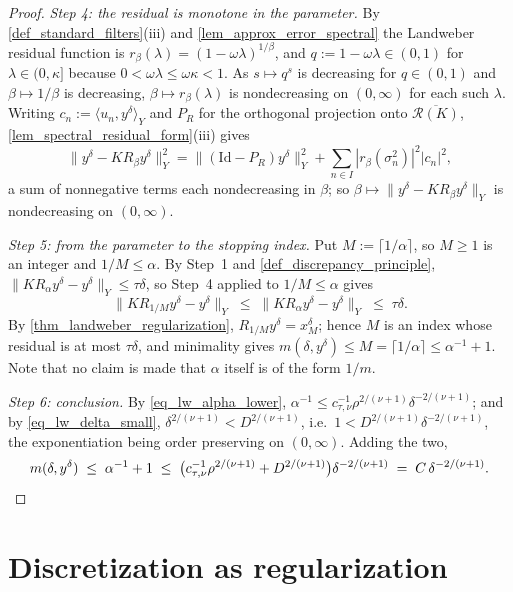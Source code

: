 \documentclass[a4paper]{report}
\theoremstyle{plain}
\theoremstyle{definition}
\theoremstyle{remark}
\newcommand{\Ran}{\mathcal{R}}
\newcommand{\Id}{\mathrm{Id}}
\begin{document}
\begin{proof}
  \emph{Step 4: the residual is monotone in the parameter.}  By
  \cref{def_standard_filters}(iii) and \cref{lem_approx_error_spectral} the Landweber
  residual function is $r_{\beta}(\lambda) = (1-\omega\lambda)^{1/\beta}$, and
  $q := 1 - \omega\lambda \in (0,1)$ for $\lambda \in (0,\kappa]$ because
  $0 < \omega\lambda \le \omega\kappa < 1$.  As $s \mapsto q^{s}$ is decreasing for
  $q \in (0,1)$ and $\beta \mapsto 1/\beta$ is decreasing, $\beta \mapsto
  r_{\beta}(\lambda)$ is nondecreasing on $(0,\infty)$ for each such $\lambda$.  Writing
  $c_n := \langle u_n, y^{\delta}\rangle_Y$ and $P_R$ for the orthogonal projection onto
  $\overline{\Ran(K)}$, \cref{lem_spectral_residual_form}(iii) gives
  \[
    \|y^{\delta} - KR_{\beta}y^{\delta}\|_Y^{2}
      = \|(\Id - P_R)y^{\delta}\|_Y^{2}
        + \sum_{n \in I}|r_{\beta}(\sigma_n^{2})|^{2}|c_n|^{2} ,
  \]
  a sum of nonnegative terms each nondecreasing in $\beta$; so
  $\beta \mapsto \|y^{\delta} - KR_{\beta}y^{\delta}\|_Y$ is nondecreasing on
  $(0,\infty)$.

  \emph{Step 5: from the parameter to the stopping index.}  Put
  $M := \lceil 1/\alpha \rceil$, so $M \ge 1$ is an integer and $1/M \le \alpha$.  By
  Step~1 and \cref{def_discrepancy_principle}, $\|KR_{\alpha}y^{\delta} - y^{\delta}\|_Y
  \le \tau\delta$, so Step~4 applied to $1/M \le \alpha$ gives
  \[
    \|KR_{1/M}y^{\delta} - y^{\delta}\|_Y
      \;\le\; \|KR_{\alpha}y^{\delta} - y^{\delta}\|_Y \;\le\; \tau\delta .
  \]
  By \cref{thm_landweber_regularization}, $R_{1/M}y^{\delta} = x^{\delta}_M$; hence $M$
  is an index whose residual is at most $\tau\delta$, and minimality gives
  $m(\delta,y^{\delta}) \le M = \lceil 1/\alpha \rceil \le \alpha^{-1} + 1$.  Note that
  no claim is made that $\alpha$ itself is of the form $1/m$.

  \emph{Step 6: conclusion.}  By \eqref{eq_lw_alpha_lower}, $\alpha^{-1} \le
  c_{\tau,\nu}^{-1}\rho^{2/(\nu+1)}\delta^{-2/(\nu+1)}$; and by
  \eqref{eq_lw_delta_small}, $\delta^{2/(\nu+1)} < D^{2/(\nu+1)}$, i.e.\
  $1 < D^{2/(\nu+1)}\delta^{-2/(\nu+1)}$, the exponentiation being order preserving on
  $(0,\infty)$.  Adding the two,
  \[
    m(\delta,y^{\delta}) \;\le\; \alpha^{-1} + 1
      \;\le\; \bigl(c_{\tau,\nu}^{-1}\rho^{2/(\nu+1)} + D^{2/(\nu+1)}\bigr)
        \delta^{-2/(\nu+1)}
      \;=\; C\,\delta^{-2/(\nu+1)} . \qedhere
  \]
\end{proof}


\chapter{Discretization as regularization}
\label{ch_18_discretization}
\end{document}
